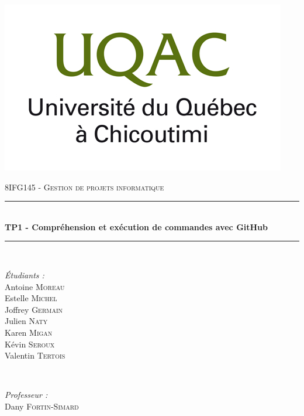 \documentclass[11pt,canadien]{article}
\begin{document}
\begin{titlepage}

\newcommand{\HRule}{\rule{\linewidth}{0.5mm}} %

\center %
 

\includegraphics[width=\textwidth]{images/uqac_logo.jpg} %
 
\textsc{\LARGE 8IFG145 - Gestion de projets informatique}\\[0.5cm]


\HRule \\[0.4cm]
{ \huge \bfseries TP1 - Compréhension et exécution de commandes avec GitHub}\\[0.4cm]
\HRule \\[0.5cm]
 

\begin{minipage}{0.4\textwidth}
\begin{flushleft} \large
\emph{Étudiants :}\\
Antoine \textsc{Moreau}\\
Estelle \textsc{Michel}\\
Joffrey \textsc{Germain}\\
Julien \textsc{Naty}\\
Karen \textsc{Migan}\\
Kévin \textsc{Seroux}\\
Valentin \textsc{Tertois}\\
\end{flushleft}
\end{minipage}
~
\begin{minipage}{0.4\textwidth}
\begin{flushright} \large
\emph{Professeur :}\\
Dany \textsc{Fortin-Simard}
\end{flushright}
\end{minipage}\\[2cm]


\end{titlepage}
\end{document}
